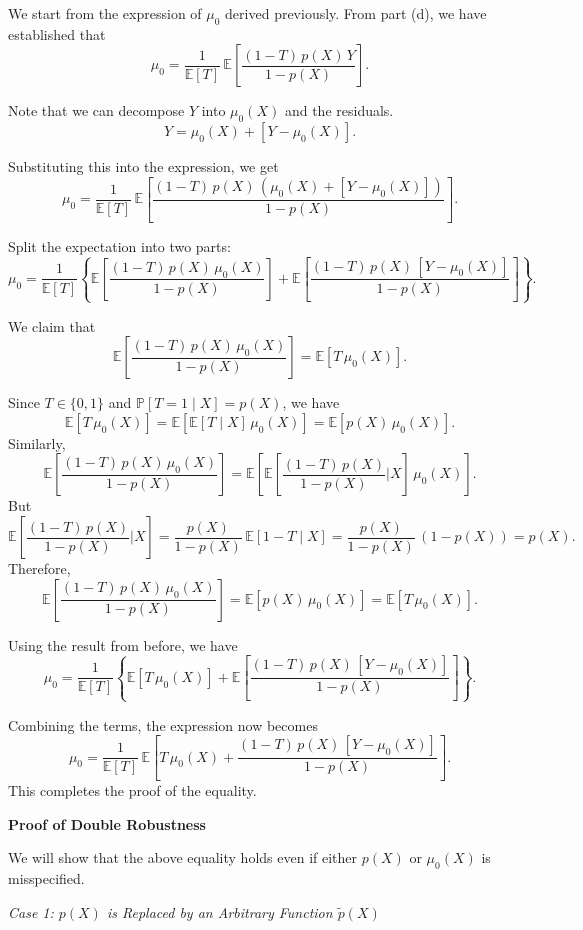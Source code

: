 \documentclass{article}
\begin{document}
We start from the expression of \(\mu_0\) derived previously. From part (d), we have established that
\[
\mu_0 = \frac{1}{\mathbb{E}[T]} \, \mathbb{E}\left[ \frac{(1 - T) \, p(X) \, Y}{1 - p(X)} \right].
\]

Note that we can decompose \(Y\) into \(\mu_0(X)\) and the residuals.
\[
Y = \mu_0(X) + [Y - \mu_0(X)].
\]

Substituting this into the expression, we get
\[
\mu_0 = \frac{1}{\mathbb{E}[T]} \, \mathbb{E}\left[ \frac{(1 - T) \, p(X) \, \left( \mu_0(X) + [Y - \mu_0(X)] \right)}{1 - p(X)} \right].
\]

Split the expectation into two parts:
\[
\mu_0 = \frac{1}{\mathbb{E}[T]} \left\{ \mathbb{E}\left[ \frac{(1 - T) \, p(X) \, \mu_0(X)}{1 - p(X)} \right] + \mathbb{E}\left[ \frac{(1 - T) \, p(X) \, [Y - \mu_0(X)]}{1 - p(X)} \right] \right\}.
\]

We claim that
\[
\mathbb{E}\left[ \frac{(1 - T) \, p(X) \, \mu_0(X)}{1 - p(X)} \right] = \mathbb{E}[T \, \mu_0(X)].
\]

Since \( T \in \{0,1\} \) and \( \mathbb{P}[T = 1 \mid X] = p(X) \), we have
\[
\mathbb{E}[T \, \mu_0(X)] = \mathbb{E}\left[ \mathbb{E}[T \mid X] \, \mu_0(X) \right] = \mathbb{E}[ p(X) \, \mu_0(X) ].
\]
Similarly,
\[
\mathbb{E}\left[ \frac{(1 - T) \, p(X) \, \mu_0(X)}{1 - p(X)} \right] = \mathbb{E}\left[ \mathbb{E}\left[ \frac{(1 - T) \, p(X)}{1 - p(X)} \Big| X \right] \, \mu_0(X) \right].
\]
But
\[
\mathbb{E}\left[ \frac{(1 - T) \, p(X)}{1 - p(X)} \Big| X \right] = \frac{p(X)}{1 - p(X)} \, \mathbb{E}[1 - T \mid X] = \frac{p(X)}{1 - p(X)} \, (1 - p(X)) = p(X).
\]
Therefore,
\[
\mathbb{E}\left[ \frac{(1 - T) \, p(X) \, \mu_0(X)}{1 - p(X)} \right] = \mathbb{E}[ p(X) \, \mu_0(X) ] = \mathbb{E}[T \, \mu_0(X)].
\]

Using the result from before, we have
\[
\mu_0 = \frac{1}{\mathbb{E}[T]} \left\{ \mathbb{E}[T \, \mu_0(X)] + \mathbb{E}\left[ \frac{(1 - T) \, p(X) \, [Y - \mu_0(X)]}{1 - p(X)} \right] \right\}.
\]

Combining the terms, the expression now becomes
\[
\mu_0 = \frac{1}{\mathbb{E}[T]} \, \mathbb{E} \left[ T \, \mu_0(X) + \frac{(1 - T) \, p(X) \, [Y - \mu_0(X)]}{1 - p(X)} \right].
\]
This completes the proof of the equality.

\textbf{Proof of Double Robustness}

We will show that the above equality holds even if either \( p(X) \) or \( \mu_0(X) \) is misspecified.

\textit{Case 1: \( p(X) \) is Replaced by an Arbitrary Function \( \tilde{p}(X) \)}
\end{document}
